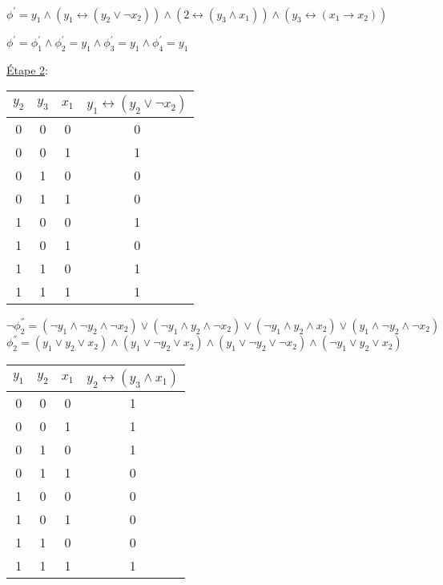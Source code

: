 \documentclass[11pt]{article}
\begin{document}
\smallskip

$\phi^{'} = y_1 \land (y_1 \leftrightarrow (y_2 \lor \lnot x_2)) \land (2 \leftrightarrow (y_3 \land x_1)) \land (y_3 \leftrightarrow (x_1 \rightarrow x_2))$

\smallskip

$\phi^{'} = \phi_1^{'} \land \phi_2^{'}= y_1 \land \phi_3^{'}= y_1 \land \phi_4^{'}= y_1$

\bigskip

\underline{Étape 2}: 

\bigskip

\begin{center}
\begin{tabular}{ |c|c|c|c|}
 \hline 
 $y_2$ & $y_3$ & $x_1$ & $y_1 \leftrightarrow (y_2 \lor \lnot x_2)$ \\   
 \hline 
0 & 0 & 0 & 0 \\
  \hline 
0 & 0 & 1 & 1 \\
  \hline 
0 & 1 & 0 & 0 \\
  \hline 
0 & 1 & 1 & 0 \\
  \hline 
1 & 0 & 0 & 1 \\
  \hline 
1 & 0 & 1 & 0 \\
  \hline 
1 & 1 & 0 & 1 \\
  \hline 
1 & 1 & 1 & 1 \\
  \hline 
\end{tabular}
\end{center}

\smallskip

\begin{center}
    $\lnot \phi_2^{''} = (\lnot y_1 \land \lnot y_2 \land \lnot x_2) \lor (\lnot y_1 \land y_2 \land \lnot x_2) \lor (\lnot y_1 \land y_2 \land x_2) \lor (y_1 \land \lnot y_2 \land \lnot x_2) $ \\
    $\phi_2^{''} = ( y_1 \lor y_2 \lor x_2) \land ( y_1 \lor \lnot y_2 \lor x_2) \land ( y_1 \lor \lnot y_2 \lor \lnot x_2) \land (\lnot y_1 \lor y_2 \lor x_2) $
\end{center}

\bigskip

\begin{center}
\begin{tabular}{ |c|c|c|c|}
 \hline 
 $y_1$ & $y_2$ & $x_1$ & $y_2 \leftrightarrow (y_3 \land x_1)$ \\   
 \hline 
0 & 0 & 0 & 1 \\
  \hline 
0 & 0 & 1 & 1 \\
  \hline 
0 & 1 & 0 & 1 \\
  \hline 
0 & 1 & 1 & 0 \\
  \hline 
1 & 0 & 0 & 0 \\
  \hline 
1 & 0 & 1 & 0 \\
  \hline 
1 & 1 & 0 & 0 \\
  \hline 
1 & 1 & 1 & 1 \\
  \hline 
\end{tabular}
\end{center}
\end{document}
